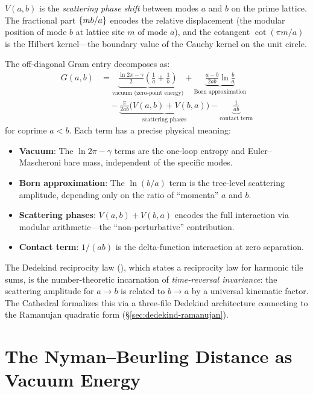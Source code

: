 \documentclass[11pt,a4paper]{article}
\begin{document}
\begin{correspondence}
$V(a,b)$ is the \emph{scattering phase shift} between modes
$a$ and $b$ on the prime lattice. The fractional part
$\{mb/a\}$ encodes the relative displacement (the modular
position of mode $b$ at lattice site $m$ of mode $a$), and the
cotangent $\cot(\pi m/a)$ is the Hilbert kernel---the boundary
value of the Cauchy kernel on the unit circle.

The off-diagonal Gram entry decomposes as:
\begin{align}
  G(a,b) &= \underbrace{\frac{\ln 2\pi - \gamma}{2}\left(\frac{1}{a}+\frac{1}{b}\right)}_{\text{vacuum (zero-point energy)}}
  + \underbrace{\frac{a-b}{2ab}\ln\frac{b}{a}}_{\text{Born approximation}}
  \nonumber \\
  &\quad - \underbrace{\frac{\pi}{2ab}\bigl(V(a,b) + V(b,a)\bigr)}_{\text{scattering phases}}
  - \underbrace{\frac{1}{ab}}_{\text{contact term}}
\end{align}
for coprime $a < b$.
Each term has a precise physical meaning:
\begin{itemize}
  \item \textbf{Vacuum}: The $\ln 2\pi - \gamma$ terms are the
    one-loop entropy and Euler--Mascheroni bare mass, independent of
    the specific modes.
  \item \textbf{Born approximation}: The $\ln(b/a)$ term is the
    tree-level scattering amplitude, depending only on the ratio of
    ``momenta'' $a$ and $b$.
  \item \textbf{Scattering phases}: $V(a,b) + V(b,a)$ encodes the
    full interaction via modular arithmetic---the ``non-perturbative''
    contribution.
  \item \textbf{Contact term}: $1/(ab)$ is the delta-function
    interaction at zero separation.
\end{itemize}
\end{correspondence}

The Dedekind reciprocity law (),
which states a reciprocity law for harmonic tile sums, is the number-theoretic
incarnation of \emph{time-reversal invariance}: the scattering amplitude
for $a \to b$ is related to $b \to a$ by a universal kinematic factor.
The Cathedral formalizes this via a three-file Dedekind architecture
connecting to the Ramanujan quadratic form (\S\ref{sec:dedekind-ramanujan}).

\section{The Nyman--Beurling Distance as Vacuum Energy}
\label{sec:vacuum}
\end{document}
